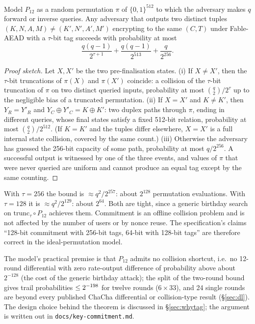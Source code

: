 \documentclass{iacrtrans}
\newcommand{\FableAEAD}{\textsf{Fable-AEAD}\xspace}
\newcommand{\ChaCha}{\textsf{ChaCha}\xspace}
\newcommand{\PP}[1]{P_{#1}}
\newcommand{\WuncTwo}{33}    %
\begin{document}
\begin{theorem}
\label{thm:cmt}
Model $\PP{12}$ as a random permutation $\pi$ of $\{0,1\}^{512}$ to which the adversary makes $q$ forward or inverse queries. Any adversary that outputs two distinct tuples $(K,N,A,M) \neq (K',N',A',M')$ encrypting to the same $(C,T)$ under \FableAEAD with a $\tau$-bit tag succeeds with probability at most
\[
\frac{q(q-1)}{2^{\tau+1}} + \frac{q(q-1)}{2^{513}} + \frac{q}{2^{256}}.
\]
\end{theorem}
\begin{proof}[Proof sketch]
Let $X, X'$ be the two pre-finalisation states. (i) If $X \neq X'$, then the $\tau$-bit truncations of $\pi(X)$ and $\pi(X')$ coincide: a collision of the $\tau$-bit truncation of $\pi$ on two distinct queried inputs, probability at most $\binom{q}{2}/2^\tau$ up to the negligible bias of a truncated permutation. (ii) If $X = X'$ and $K \neq K'$, then $Y_R = Y'_R$ and $Y_C \oplus Y'_C = K\oplus K'$: two duplex paths through $\pi$, ending in different queries, whose final states satisfy a fixed 512-bit relation, probability at most $\binom{q}{2}/2^{512}$. (If $K = K'$ and the tuples differ elsewhere, $X = X'$ is a full internal state collision, covered by the same count.) (iii) Otherwise the adversary has guessed the 256-bit capacity of some path, probability at most $q/2^{256}$. A successful output is witnessed by one of the three events, and values of $\pi$ that were never queried are uniform and cannot produce an equal tag except by the same counting.
\end{proof}

\begin{corollary}
With $\tau = 256$ the bound is $\approx q^2/2^{257}$: about $2^{128}$ permutation evaluations. With $\tau = 128$ it is $\approx q^2/2^{129}$: about $2^{64}$. Both are tight, since a generic birthday search on $\mathrm{trunc}_\tau\circ\PP{12}$ achieves them. Commitment is an offline collision problem and is not affected by the number of users or by nonce reuse. The specification's claims ``128-bit commitment with 256-bit tags, 64-bit with 128-bit tags'' are therefore correct in the ideal-permutation model.
\end{corollary}
The model's practical premise is that $\PP{12}$ admits no collision shortcut, i.e.\ no 12-round differential with zero rate-output difference of probability above about $2^{-128}$ (the cost of the generic birthday attack); the split of the two-round bound gives trail probabilities $\leq 2^{-\the\numexpr 6*\WuncTwo\relax}$ for twelve rounds ($6\times \WuncTwo$), and 24 single rounds are beyond every published \ChaCha differential or collision-type result (\S\ref{sec:dl}). The design choice behind the theorem is discussed in \S\ref{sec:whytag}; the argument is written out in \texttt{docs/key-commitment.md}.
\end{document}

